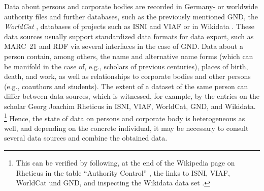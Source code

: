 Data about persons and corporate bodies are recorded
in Germany- or worldwide authority files and further databases,
such as the previously mentioned GND,
the \emph{WorldCat} \autocite{WorldCat},
databases of projects such as ISNI \autocite{ISNI}
and VIAF \autocite{VIAF}
or in Wikidata \autocite{Wikidata}.
These data sources usually support standardized data formats for data export,
such as MARC~21 and RDF via several interfaces in the case of GND.
Data about a person contain, among others, the name and alternative name forms
(which can be manifold in the case of, e.g., scholars of previous centuries),
places of birth, death, and work,
as well as relationships to corporate bodies and other persons
(e.g., coauthors and students).
The extent of a dataset of the same person can differ between data sources,
which is witnessed, for example, by the entries on the scholar
Georg Joachim Rheticus in ISNI, VIAF, WorldCat, GND, and Wikidata.%
\footnote{%
  This can be verified by following,
  at the end of the Wikipedia page on Rheticus 
  in the table \enquote{Authority Control}
  \autocite{WikiRheticusExternalLinks},
  the links to ISNI, VIAF, WorldCat und GND,
  and inspecting the Wikidata data set
  \autocite{WikidataRheticus}.
}
Hence, the state of data on persons and corporate body is heterogeneous as well,
and depending on the concrete individual, it may be necessary
to consult several data sources and combine the obtained data.

